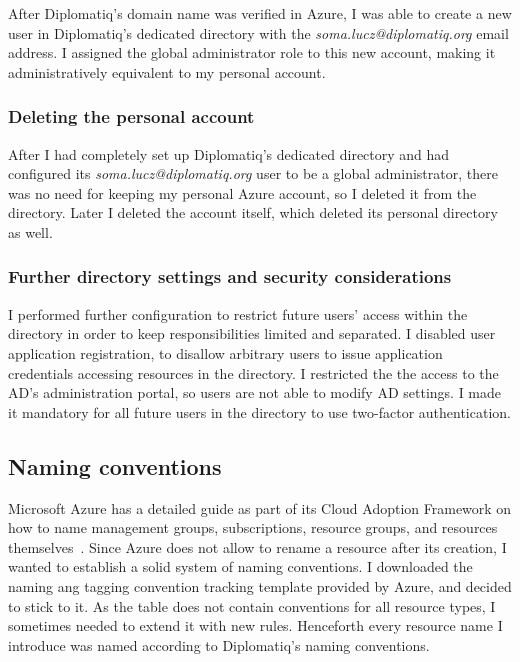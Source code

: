 After Diplomatiq's domain name was verified in Azure, I was able to create a new user in Diplomatiq's dedicated directory with the \emph{soma.lucz@diplomatiq.org} email address. I assigned the global administrator role to this new account, making it administratively equivalent to my personal account.

\subsubsection{Deleting the personal account}

After I had completely set up Diplomatiq's dedicated directory and had configured its \emph{soma.lucz@diplomatiq.org} user to be a global administrator, there was no need for keeping my personal Azure account, so I deleted it from the directory. Later I deleted the account itself, which deleted its personal directory as well.

\subsubsection{Further directory settings and security considerations}

I performed further configuration to restrict future users' access within the directory in order to keep responsibilities limited and separated. I disabled user application registration, to disallow arbitrary users to issue application credentials accessing resources in the directory. I restricted the the access to the AD's administration portal, so users are not able to modify AD settings. I made it mandatory for all future users in the directory to use two-factor authentication.

\subsection{Naming conventions}

Microsoft Azure has a detailed guide as part of its Cloud Adoption Framework on how to name management groups, subscriptions, resource groups, and resources themselves~\cite{azure-naming}. Since Azure does not allow to rename a resource after its creation, I wanted to establish a solid system of naming conventions. I downloaded the naming ang tagging convention tracking template provided by Azure, and decided to stick to it. As the table does not contain conventions for all resource types, I sometimes needed to extend it with new rules. Henceforth every resource name I introduce was named according to Diplomatiq's naming conventions.

